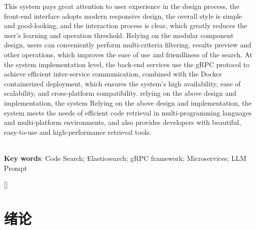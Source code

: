 \documentclass[UTF8,a4paper,12pt]{ctexart}
\numberwithin{equation}{section}
\renewcommand\thesection{\arabic{section}}
\begin{document}
This system pays great attention to user experience in the design process, the front-end interface adopts modern responsive design, the overall style is simple and good-looking, and the interaction process is clear, which greatly reduces the user's learning and operation threshold. Relying on the modular component design, users can conveniently perform multi-criteria filtering, results preview and other operations, which improves the ease of use and friendliness of the search. At the system implementation level, the back-end services use the gRPC protocol to achieve efficient inter-service communication, combined with the Docker containerized deployment, which ensures the system's high availability, ease of scalability, and cross-platform compatibility. relying on the above design and implementation, the system Relying on the above design and implementation, the system meets the needs of efficient code retrieval in multi-programming languages and multi-platform environments, and also provides developers with beautiful, easy-to-use and high-performance retrieval tools. \par
~\\ 
\hspace*{2em}\textbf{Key words}: Code Search; Elasticsearch; gRPC framework; Microservices; LLM Prompt\\

\newpage
{}

\renewcommand\contentsname{{目\quad 录}}

\begin{center}
{\tableofcontents
\thispagestyle{fancy}
}
\end{center}



\newpage
{}


\titleformat{\section}{\heiti\zihao{3}\centering}{\thesection}{0.5em}{}[]
\section{绪论}
\end{document}
